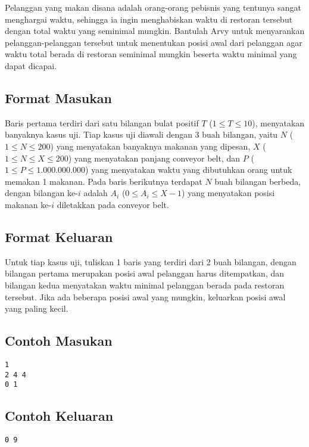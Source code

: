 \documentclass{article}
\begin{document}
Pelanggan yang makan disana adalah orang-orang pebisnis yang tentunya sangat menghargai waktu, sehingga ia ingin menghabiskan waktu di restoran tersebut dengan total waktu yang seminimal mungkin. Bantulah Arvy untuk menyarankan pelanggan-pelanggan tersebut untuk menentukan posisi awal dari pelanggan agar waktu total berada di restoran seminimal mungkin beserta waktu minimal yang dapat dicapai.

\subsection*{Format Masukan}

Baris pertama terdiri dari satu bilangan bulat positif $T$ ($1 \leq T \leq 10$), menyatakan banyaknya kasus uji.
Tiap kasus uji diawali dengan 3 buah bilangan, yaitu $N$ ($1 \leq N \leq 200$) yang menyatakan banyaknya makanan yang dipesan, $X$ ($1 \leq N \leq X \leq 200$) yang menyatakan panjang conveyor belt, dan $P$ ($1 \leq P \leq 1.000.000.000$) yang menyatakan waktu yang dibutuhkan orang untuk memakan 1 makanan.
Pada baris berikutnya terdapat $N$ buah bilangan berbeda, dengan bilangan ke-$i$ adalah $A_i$ ($0 \leq A_i \leq X-1$) yang menyatakan posisi makanan ke-$i$ diletakkan pada conveyor belt.

\subsection*{Format Keluaran}

Untuk tiap kasus uji, tuliskan 1 baris yang terdiri dari 2 buah bilangan, dengan bilangan pertama merupakan posisi awal pelanggan harus ditempatkan, dan bilangan kedua menyatakan waktu minimal pelanggan berada pada restoran tersebut. Jika ada beberapa posisi awal yang mungkin, keluarkan posisi awal yang paling kecil.
\\

\begin{multicols}{2}
\subsection*{Contoh Masukan}
\begin{lstlisting}
1
2 4 4
0 1

\end{lstlisting}
\columnbreak
\subsection*{Contoh Keluaran}
\begin{lstlisting}
0 9
\end{lstlisting}
\vfill
\null
\end{multicols}
\end{document}

